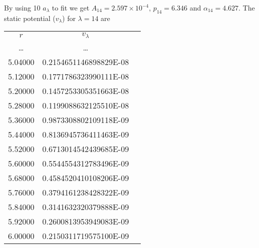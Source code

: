 \documentclass[aps,pra,groupedaddress,
                amsfonts,amssymb,
                preprint
    ]{revtex4}
\begin{document}
By using 10 $a_\lambda$ to fit  we get $A_{14} = 2.597\times
10^{-4}$, $p_{14} = 6.346$ and $\alpha_{14} = 4.627$. The static
potential ($v_\lambda$) for $\lambda = 14$ are
\begin{center}
\begin{tabular}{ccc}
     $r$   &    $v_\lambda$ \\
   \ldots  &  \ldots               \\
   5.04000 &   \quad 0.2154651146898829E-08 \\
   5.12000 &   \quad 0.1771786323990111E-08 \\
   5.20000 &   \quad 0.1457253305351663E-08 \\
   5.28000 &   \quad 0.1199088632125510E-08 \\
   5.36000 &   \quad 0.9873308802109118E-09 \\
   5.44000 &   \quad 0.8136945736411463E-09 \\
   5.52000 &   \quad 0.6713014542439685E-09 \\
   5.60000 &   \quad 0.5544554312783496E-09 \\
   5.68000 &   \quad 0.4584520410108206E-09 \\
   5.76000 &   \quad 0.3794161238428322E-09 \\
   5.84000 &   \quad 0.3141632320379888E-09 \\
   5.92000 &   \quad 0.2600813953949083E-09 \\
   6.00000 &   \quad 0.2150311719575100E-09
\end{tabular}
\end{center}
\end{document}
